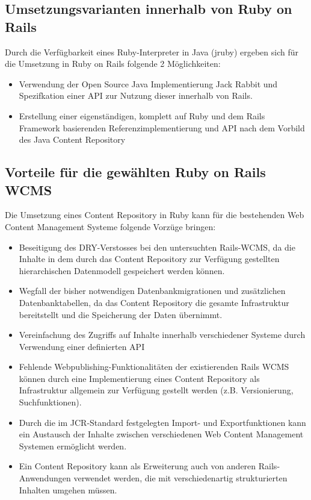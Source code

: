 \subsection{Umsetzungsvarianten innerhalb von Ruby on Rails}

Durch die Verfügbarkeit eines Ruby-Interpreter in Java (jruby) ergeben sich für die Umsetzung in Ruby on Rails folgende 2 Möglichkeiten:

\begin{itemize}
\item
Verwendung der Open Source Java Implementierung Jack Rabbit und Spezifkation einer API zur Nutzung dieser innerhalb von Rails.
\item
Erstellung einer eigenständigen, komplett auf Ruby und dem Rails Framework basierenden Referenzimplementierung und API nach dem Vorbild des Java Content Repository
\end{itemize}



\subsection{Vorteile für die gewählten Ruby on Rails WCMS}

Die Umsetzung eines Content Repository in Ruby kann für die bestehenden Web Content Management Systeme folgende Vorzüge bringen:

\begin{itemize}
\item Beseitigung des DRY-Verstosses bei den untersuchten Rails-WCMS, da die Inhalte in dem durch das Content Repository zur Verfügung gestellten hierarchischen Datenmodell gespeichert werden können.
\item
Wegfall der bisher notwendigen Datenbankmigrationen und zusätzlichen Datenbanktabellen, da das Content Repository die gesamte Infrastruktur bereitstellt und die Speicherung der Daten übernimmt.
\item Vereinfachung des Zugriffs auf Inhalte innerhalb verschiedener Systeme durch Verwendung einer definierten API
\item Fehlende Webpublishing-Funktionalitäten der existierenden Rails WCMS können durch eine Implementierung eines Content Repository als Infrastruktur allgemein zur Verfügung gestellt werden (z.B. Versionierung, Suchfunktionen).
\item Durch die im JCR-Standard festgelegten Import- und Exportfunktionen kann ein Austausch der Inhalte zwischen verschiedenen Web Content Management Systemen ermöglicht werden.
\item Ein Content Repository kann als Erweiterung auch von anderen Rails-Anwendungen verwendet werden, die mit verschiedenartig strukturierten Inhalten umgehen müssen.
\end{itemize}



